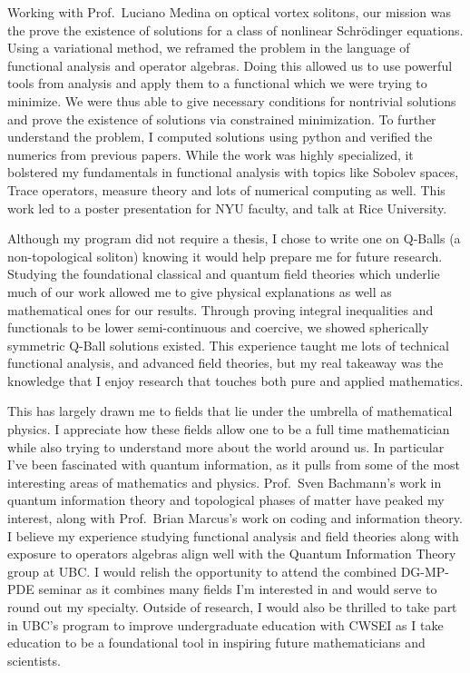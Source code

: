 \documentclass[11pt]{article}
\begin{document}
Working with Prof.\ Luciano Medina on optical vortex solitons, our mission was the prove the existence of solutions for a class of nonlinear Schr\"{o}dinger equations. Using a variational method, we reframed the problem in the language of functional analysis and operator algebras. Doing this allowed us to use powerful tools from analysis and apply them to a functional which we were trying to minimize. We were thus able to give necessary conditions for nontrivial solutions and prove the existence of solutions via constrained minimization. To further understand the problem, I computed solutions using python and verified the numerics from previous papers. While the work was highly specialized, it bolstered my fundamentals in functional analysis with topics like Sobolev spaces, Trace operators, measure theory and lots of numerical computing as well. This work led to a poster presentation for NYU faculty, and talk at Rice University.

Although my program did not require a thesis, I chose to write one on Q-Balls (a non-topological soliton) knowing it would help prepare me for future research. Studying the foundational classical and quantum field theories which underlie much of our work allowed me to give physical explanations as well as mathematical ones for our results. Through proving integral inequalities and functionals to be lower semi-continuous and coercive, we showed spherically symmetric Q-Ball solutions existed. This experience taught me lots of technical functional analysis, and advanced field theories, but my real takeaway was the knowledge that I enjoy research that touches both pure and applied mathematics.

This has largely drawn me to fields that lie under the umbrella of mathematical physics. I appreciate how these fields allow one to be a full time mathematician while also trying to understand more about the world around us. In particular I've been fascinated with quantum information, as it pulls from some of the most interesting areas of mathematics and physics. Prof.\ Sven Bachmann's work in quantum information theory and topological phases of matter have peaked my interest, along with Prof.\ Brian Marcus's work on coding and information theory. I believe my experience studying functional analysis and field theories along with exposure to operators algebras align well with the Quantum Information Theory group at UBC. I would relish the opportunity to attend the combined DG-MP-PDE seminar as it combines many fields I'm interested in and would serve to round out my specialty. Outside of research, I would also be thrilled to take part in UBC's program to improve undergraduate education with CWSEI as I take education to be a foundational tool in inspiring future mathematicians and scientists.
\end{document}
